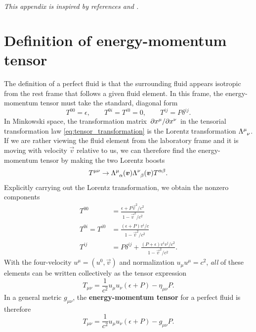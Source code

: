 \textit{This appendix is inspired by references \cite{ref:mtw} and \cite{ref:weinberg_gravity}.}

\section{Definition of energy-momentum tensor}

The definition of a perfect fluid is that the surrounding fluid appears isotropic from the rest frame that follows a given fluid element.
In this frame, the energy-momentum tensor must take the standard, diagonal form
\begin{equation}
	T^{00} = \epsilon , \qquad
	T^{0i} = T^{i0} = 0 , \qquad
	T^{ij} = P \delta^{ij} .
\end{equation}
In Minkowski space, the transformation matrix $\pdv{x^\mu}/{x^\nu}$ in the tensorial transformation law \eqref{eq:tensor_transformation} is the Lorentz transformation $\Lambda\indices{^\mu_\nu}$. \cite{ref:mika_gr_notes}
If we are rather viewing the fluid element from the laboratory frame and it is moving with velocity $\vec{v}$ relative to us, we can therefore find the energy-momentum tensor by making the two Lorentz boosts
\begin{equation}
	T^{\mu \nu} \rightarrow \Lambda\indices{^\mu_\alpha}(\vec{v}) \Lambda\indices{^\nu_\beta}(\vec{v}) T^{\alpha \beta} .
\end{equation}
Explicitly carrying out the Lorentz transformation, we obtain the nonzero components
\begin{subequations}
\begin{align}
	T^{00} &= \frac{\epsilon + P \vec{v}^2 / c^2}{1 - \vec{v}^2 / c^2} \\
	T^{0i} = T^{i0} &= \frac{(\epsilon + P) v^i / c}{1 - \vec{v}^2 / c^2} \\
	T^{ij} &= P \delta^{ij} + \frac{(P + \epsilon) v^i v^j / c^2}{1 - \vec{v}^2 / c^2} .
\end{align}
\end{subequations}
With the four-velocity $u^\mu = (u^0, \vec{v})$ and normalization $u_\mu u^\mu = c^2$, \emph{all} of these elements can be written collectively as the tensor expression
\begin{equation}
	T_{\mu \nu} = \frac{1}{c^2} u_\mu u_\nu (\epsilon + P) - \eta_{\mu \nu} P .
\end{equation}
In a general metric $g_{\mu \nu}$, the \textbf{energy-momentum tensor} for a perfect fluid is therefore
\begin{equation}
	T_{\mu \nu} = \frac{1}{c^2} u_\mu u_\nu (\epsilon + P) - g_{\mu \nu} P .
\end{equation}

